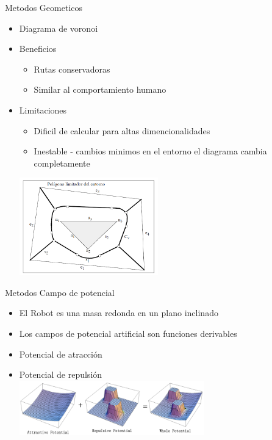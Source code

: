 \documentclass[
	11pt, %
]{beamer}
\begin{document}
\begin{frame}{Metodos Geometicos}
  \begin{itemize}
  \item Diagrama de voronoi\\
  \item Beneficios\\
    \begin{itemize}
    \item Rutas conservadoras
    \item Similar al comportamiento humano
    \end{itemize}
  \item Limitaciones\\
    \begin{itemize}
    \item Dificil de calcular para altas dimencionalidades
    \item Inestable - cambios minimos en el entorno el diagrama cambia completamente
    \end{itemize}    
    \centering
    \bigskip %
    \includegraphics[width=6cm]{voronoi}
  \end{itemize}
\end{frame}

\begin{frame}{Metodos Campo de potencial}
  \begin{itemize}
  \item El Robot es una masa redonda en un plano inclinado \\
  \item Los campos de potencial artificial son funciones derivables\\
  \item Potencial de atracción\\
  \item Potencial de repulsión\\
    \centering
    \bigskip %
    \includegraphics[width=8cm]{potential-field1_robot.jpg}
  \end{itemize}
\end{frame}
\end{document}
